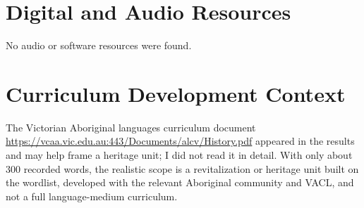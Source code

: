 \documentclass[12pt]{article}
\begin{document}
\section{Digital and Audio Resources}
No audio or software resources were found.

\section{Curriculum Development Context}
The Victorian Aboriginal languages curriculum document \url{https://vcaa.vic.edu.au:443/Documents/alcv/History.pdf} appeared in the results and may help frame a heritage unit; I did not read it in detail. With only about 300 recorded words, the realistic scope is a revitalization or heritage unit built on the wordlist, developed with the relevant Aboriginal community and VACL, and not a full language-medium curriculum.
\end{document}
